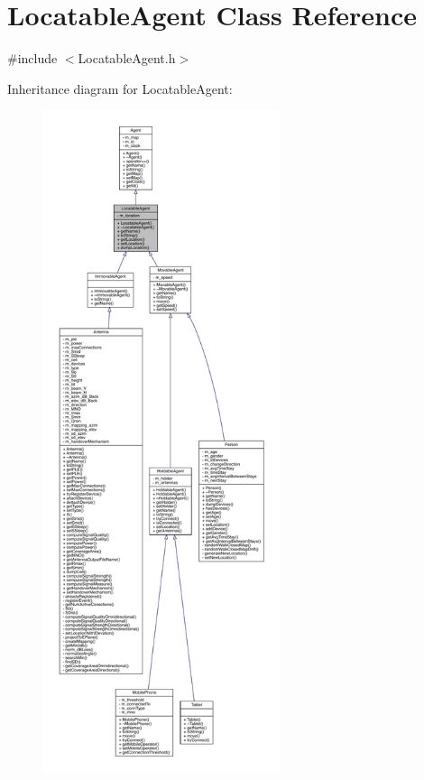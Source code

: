\hypertarget{class_locatable_agent}{}\section{Locatable\+Agent Class Reference}
\label{class_locatable_agent}


{\ttfamily \#include $<$Locatable\+Agent.\+h$>$}



Inheritance diagram for Locatable\+Agent\+:\nopagebreak
\begin{figure}[H]
\begin{center}
\leavevmode
\includegraphics[height=550pt]{class_locatable_agent__inherit__graph}
\end{center}
\end{figure}


